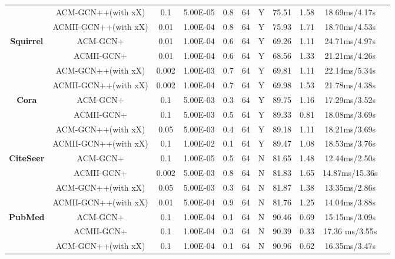 \documentclass{article}
\newcommand{\0}{{\boldsymbol{0}}}
\newcommand{\6}{{\partial}}
\newcommand{\8}{{\infty}}
\newcommand{\4}{{\nabla}}
\begin{document}
\begin{table}[htbp]
{\begin{tabular}{c|c|ccccccccc}
          & ACM-GCN++(with xX) & 0.1   & 5.00E-05 & 0.8   & 64    & Y     & 75.51 & 1.58  & 18.69ms/4.17s \\
          & ACMII-GCN++(with xX) & 0.01  & 1.00E-04 & 0.8   & 64    & Y     & 75.93 & 1.71  & 18.70ms/4.53s \\
    \midrule
    \multirow{4}[2]{*}{\textbf{Squirrel}} & ACM-GCN+ & 0.01  & 1.00E-04 & 0.6   & 64    & Y     & 69.26 & 1.11  & 24.71ms/4.97s \\
          & ACMII-GCN+ & 0.01  & 1.00E-04 & 0.6   & 64    & Y     & 68.56 & 1.33  & 21.21ms/4.26s \\
          & ACM-GCN++(with xX) & 0.002 & 1.00E-03 & 0.7   & 64    & Y     & 69.81 & 1.11  & 22.14ms/5.34s \\
          & ACMII-GCN++(with xX) & 0.002 & 1.00E-04 & 0.7   & 64    & Y     & 69.98 & 1.53  & 21.78ms/4.38s \\
    \midrule
    \multirow{4}[2]{*}{\textbf{Cora}} & ACM-GCN+ & 0.1   & 5.00E-03 & 0.3   & 64    & Y     & 89.75 & 1.16  & 17.29ms/3.52s \\
          & ACMII-GCN+ & 0.1   & 5.00E-03 & 0.5   & 64    & Y     & 89.33 & 0.81  & 18.08ms/3.69s \\
          & ACM-GCN++(with xX) & 0.05  & 5.00E-03 & 0.4   & 64    & Y     & 89.18 & 1.11  & 18.21ms/3.69s \\
          & ACMII-GCN++(with xX) & 0.1   & 1.00E-02 & 0.1   & 64    & Y     & 89.47 & 1.08  & 18.53ms/3.76s \\
    \midrule
    \multirow{4}[2]{*}{\textbf{CiteSeer}} & ACM-GCN+ & 0.1   & 1.00E-05 & 0.5   & 64    & N     & 81.65 & 1.48  & 12.44ms/2.50s \\
          & ACMII-GCN+ & 0.002 & 5.00E-03 & 0.8   & 64    & N     & 81.83 & 1.65  & 14.87ms/15.36s \\
          & ACM-GCN++(with xX) & 0.05  & 5.00E-03 & 0.3   & 64    & N     & 81.87 & 1.38  & 13.35ms/2.86s \\
          & ACMII-GCN++(with xX) & 0.01  & 5.00E-04 & 0.9   & 64    & N     & 81.76 & 1.25  & 14.04ms/3.88s \\
    \midrule
    \multirow{4}[2]{*}{\textbf{PubMed}} & ACM-GCN+ & 0.1   & 1.00E-04 & 0.1   & 64    & N     & 90.46 & 0.69  & 15.15ms/3.09s \\
          & ACMII-GCN+ & 0.1   & 1.00E-04 & 0.3   & 64    & N     & 90.39 & 0.33  & 17.36 ms/3.55s \\
          & ACM-GCN++(with xX) & 0.1   & 1.00E-04 & 0.1   & 64    & N     & 90.96 & 0.62  & 16.35ms/3.47s \\

\end{tabular}}
\end{table}
\end{document}
